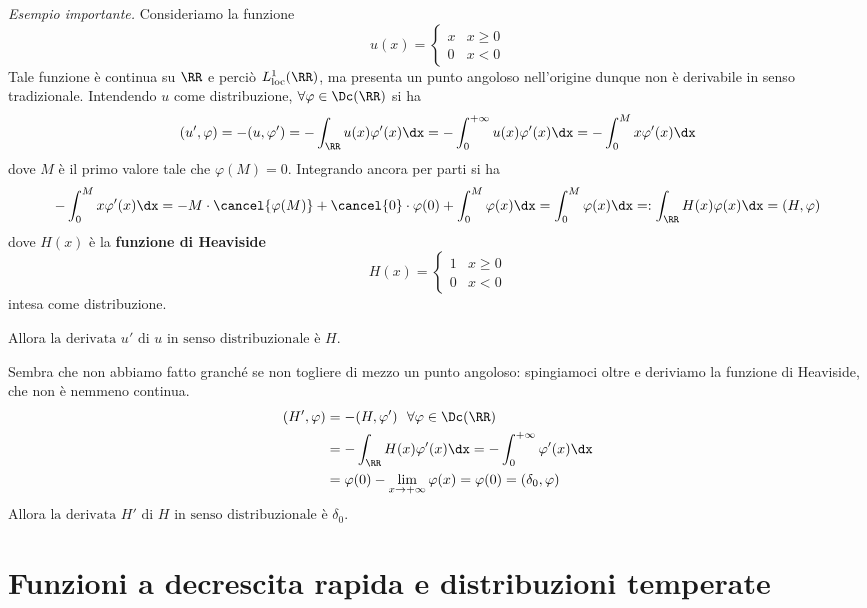 \textit{Esempio importante.} Consideriamo la funzione
\begin{equation*}
u(x) =
\begin{cases}
x & x \geq 0\\
0 & x < 0
\end{cases}
\end{equation*}
Tale funzione è continua su $\RR$ e perciò $L^1_{\loc}(\RR)$, ma presenta un punto angoloso nell'origine dunque non è derivabile in senso tradizionale. Intendendo $u$ come distribuzione, $\forall\varphi \in \Dc(\RR)$ si ha
\begin{equation*}
(u', \varphi) = - (u, \varphi') = - \int_{\RR} u(x) \varphi'(x) \dx=- \int_0^{+\infty} u(x) \varphi'(x) \dx = - \int^{M}_{0} x\varphi'(x) \dx
\end{equation*}
dove $M$ è il primo valore tale che $\varphi(M)=0$. Integrando ancora per parti si ha
\begin{equation*}
- \int^{M}_{0} x\varphi'(x) \dx =-M\cdot\cancel{\varphi(M)}+\cancel{0}\cdot\varphi(0)+\int^{M}_{0} \varphi (x) \dx = \int^{M}_{0} \varphi (x) \dx=: \int_\RR H(x) \varphi (x) \dx = (H, \varphi)
\end{equation*}
dove $H(x)$ è la \textbf{funzione di Heaviside}
\begin{equation*}
H(x) =
\begin{cases}
1 & x \geq 0\\
0 & x < 0
\end{cases}
\end{equation*}
intesa come distribuzione.

Allora $\boxed{\text{la derivata } u'\text{ di } u\text{ in senso distribuzionale è }H}$.

Sembra che non abbiamo fatto granché se non togliere di mezzo un punto angoloso: spingiamoci oltre e deriviamo la funzione di Heaviside, che non è nemmeno continua.
\begin{align*}
(H', \varphi) & = - (H, \varphi') \ \ \forall \varphi \in \Dc(\RR)\\
 & = - \int_{\RR} H(x) \varphi'(x) \dx = - \int^{+ \infty}_{0} \varphi'(x) \dx\\
 & = \varphi (0) - \lim_{x\rightarrow + \infty} \varphi (x) = \varphi (0) = (\delta_{0}, \varphi)
\end{align*}
Allora $\boxed{\text{la derivata } H'\text{ di } H\text{ in senso distribuzionale è }\delta_0}$.


\section{Funzioni a decrescita rapida e distribuzioni temperate}

